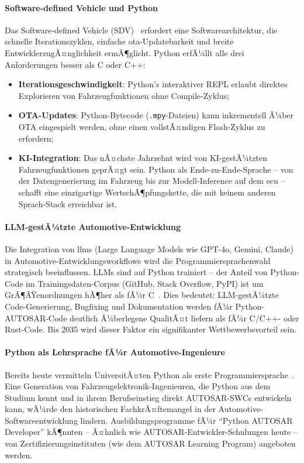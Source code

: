 ﻿\documentclass[12pt,a4paper,twoside]{article}
\begin{document}
\paragraph{Software-defined Vehicle und Python}
Das Software-defined Vehicle (SDV)~\cite{sdv_mckinsey2023} erfordert
eine Softwarearchitektur, die schnelle Iterations\-zyklen, einfache
\gls{ota}-Updatebarkeit und breite EntwicklerzugÃ¤nglichkeit ermÃ¶glicht.
Python erfÃ¼llt alle drei Anforderungen besser als C oder C++:
\begin{itemize}
  \item \textbf{Iterationsgeschwindigkeit}: Python's interaktiver REPL erlaubt
        direktes Explorieren von Fahrzeugfunktionen ohne Compile-Zyklus;
  \item \textbf{OTA-Updates}: Python-Bytecode (\texttt{.mpy}-Dateien)
        kann inkrementell Ã¼ber OTA eingespielt werden, ohne
        einen vollstÃ¤ndigen Flash-Zyklus zu erfordern;
  \item \textbf{KI-Integration}: Das nÃ¤chste Jahrzehnt wird von
        KI-gestÃ¼tzten Fahrzeugfunktionen geprÃ¤gt sein.
        Python als Ende-zu-Ende-Sprache -- von der Datengenerierung im
        Fahrzeug bis zur Modell-Inference auf dem \gls{ecu} -- schafft
        eine einzigartige WertschÃ¶pfungskette, die mit keinem anderen
        Sprach-Stack erreichbar ist.
\end{itemize}

\paragraph{LLM-gestÃ¼tzte Automotive-Entwicklung}
Die Integration von \glspl{llm} (Large Language Models wie GPT-4o,
Gemini, Claude) in Automotive-Entwicklungsworkflows wird
die Programmiersprachenwahl strategisch beeinflussen.
LLMs sind auf Python trainiert -- der Anteil von Python-Code
im Trainingsdaten-Corpus (GitHub, Stack Overflow, PyPI) ist
um GrÃ¶ÃŸenordnungen hÃ¶her als fÃ¼r C~\cite{stackoverflow_survey2024}.
Dies bedeutet: LLM-gestÃ¼tzte Code-Generierung, Bugfixing und
Dokumentation werden fÃ¼r Python-AUTOSAR-Code deutlich Ã¼berlegene
QualitÃ¤t liefern als fÃ¼r C/C++- oder Rust-Code.
Bis 2035 wird dieser Faktor ein signifikanter Wettbewerbsvorteil sein.

\paragraph{Python als Lehrsprache fÃ¼r Automotive-Ingenieure}
Bereits heute vermitteln UniversitÃ¤ten Python als erste
Programmiersprache~\cite{python_courses2023}.
Eine Generation von Fahrzeugelektronik-Ingenieuren,
die Python aus dem Studium kennt und in ihrem Berufs\-einstieg
direkt AUTOSAR-SWCs entwickeln kann, wÃ¼rde den historischen
FachkrÃ¤ftemangel in der Automotive-Softwareentwicklung lindern.
Ausbildungsprogramme fÃ¼r ``Python AUTOSAR Developer'' kÃ¶nnten
-- Ã¤hnlich wie AUTOSAR-Entwickler-Schulungen heute -- von
Zertifizierungsinstituten (wie dem AUTOSAR Learning Program)
angeboten werden.
\end{document}
